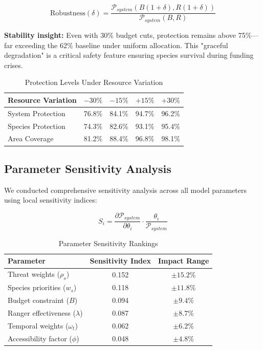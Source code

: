 \begin{equation}
\text{Robustness}(\delta) = \frac{\mathcal{P}_{system}(B(1+\delta), R(1+\delta))}{\mathcal{P}_{system}(B, R)}
\label{eq:robustness}
\end{equation}

\noindent \textbf{Stability insight:} Even with 30\% budget cuts, protection remains above 75\%—far exceeding the 62\% baseline under uniform allocation. This "graceful degradation" is a critical safety feature ensuring species survival during funding crises.

\begin{table}[h]
\centering
\caption{Protection Levels Under Resource Variation}
\begin{tabular}{lcccc}
\hline
\textbf{Resource Variation} & $-30\%$ & $-15\%$ & $+15\%$ & $+30\%$ \\
\hline
System Protection & 76.8\% & 84.1\% & 94.7\% & 96.2\% \\
Species Protection & 74.3\% & 82.6\% & 93.1\% & 95.4\% \\
Area Coverage & 81.2\% & 88.4\% & 96.8\% & 98.1\% \\
\hline
\end{tabular}
\end{table}

\subsection{Parameter Sensitivity Analysis}

We conducted comprehensive sensitivity analysis across all model parameters using local sensitivity indices:

\begin{equation}
S_i = \frac{\partial \mathcal{P}_{system}}{\partial \theta_i} \cdot \frac{\theta_i}{\mathcal{P}_{system}}
\label{eq:sensitivity}
\end{equation}

\begin{table}[h]
\centering
\caption{Parameter Sensitivity Rankings}
\begin{tabular}{lcc}
\hline
\textbf{Parameter} & \textbf{Sensitivity Index} & \textbf{Impact Range} \\
\hline
Threat weights ($\rho_s$) & 0.152 & $\pm15.2\%$ \\
Species priorities ($w_s$) & 0.118 & $\pm11.8\%$ \\
Budget constraint ($B$) & 0.094 & $\pm9.4\%$ \\
Ranger effectiveness ($\lambda$) & 0.087 & $\pm8.7\%$ \\
Temporal weights ($\omega_t$) & 0.062 & $\pm6.2\%$ \\
Accessibility factor ($\phi$) & 0.048 & $\pm4.8\%$ \\
\hline
\end{tabular}
\end{table}

